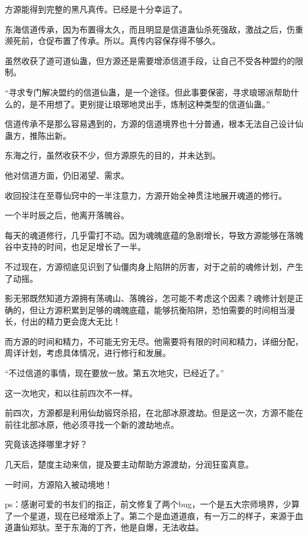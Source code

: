 \begin{this_body}
方源能得到完整的黑凡真传。已经是十分幸运了。

东海信道传承，因为布置得太久，而且明显是信道蛊仙杀死强敌，激战之后，伤重濒死前，仓促布置了传承。所以。真传内容保存得不够久。

虽然收获了道可道仙蛊，但方源还是需要增添信道手段，让自己不受各种盟约的限制。

“寻求专门解决盟约的信道仙蛊，是一个途径。但此事要保密，寻求琅琊派帮助什么的，是不用想了。更别提让琅琊地灵出手，炼制这种类型的信道仙蛊。”

信道传承不是那么容易遇到的，方源的信道境界也十分普通，根本无法自己设计仙蛊方，推陈出新。

东海之行，虽然收获不少，但方源原先的目的，并未达到。

他对信道方面，仍旧渴望、需求。

收回投注在至尊仙窍中的一半注意力，方源开始全神贯注地展开魂道的修行。

一个半时辰之后，他离开落魄谷。

每天的魂道修行，几乎雷打不动。因为魂魄底蕴的急剧增长，导致方源能够在落魄谷中支持的时间，也足足增长了一半。

不过现在，方源彻底见识到了仙僵肉身上陷阱的厉害，对于之前的魂修计划，产生了动摇。

影无邪既然知道方源拥有荡魂山、落魄谷，怎可能不考虑这个因素？魂修计划是正确的，但让方源积累到足够的魂魄底蕴，能够抗衡陷阱，恐怕需要的时间相当漫长，付出的精力更会庞大无比！

而方源的时间和精力，不可能无穷无尽。他需要将有限的时间和精力，详细分配，周详计划，考虑具体情况，进行修行和发展。

“不过信道的事情，现在要放一放。第五次地灾，已经近了。”

这一次地灾，和以往前四次不一样。

前四次，方源都是利用仙劫锻窍杀招，在北部冰原渡劫。但是这一次，方源不能在前往北部冰原，他必须寻找一个新的渡劫地点。

究竟该选择哪里才好？

几天后，楚度主动来信，提及要主动帮助方源渡劫，分润狂蛮真意。

一时间，方源陷入被动境地！

ps：感谢可爱的书友们的指正，前文修复了两个bug，一个是五大宗师境界，少算了一个星道，现在已经增添上了。第二个是血道道痕，有一万二的样子，来源于血道蛊仙郑驮。至于东海的丁齐，他是自爆，无法收益。

\end{this_body}

